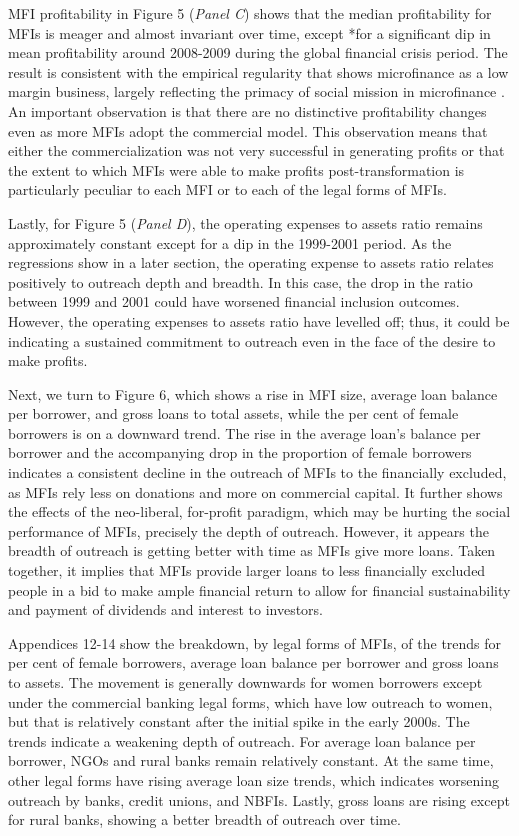 \documentclass[a4paper,nobind]{templates/ociamthesis}
\begin{document}
MFI profitability in Figure 5 (\emph{Panel C}) shows that the median profitability for MFIs is meager and almost invariant over time, except *for a significant dip in mean profitability around 2008-2009 during the global financial crisis period. The result is consistent with the empirical regularity that shows microfinance as a low margin business, largely reflecting the primacy of social mission in microfinance \autocite{hartarska2012governance}. An important observation is that there are no distinctive profitability changes even as more MFIs adopt the commercial model. This observation means that either the commercialization was not very successful in generating profits or that the extent to which MFIs were able to make profits post-transformation is particularly peculiar to each MFI or to each of the legal forms of MFIs.

Lastly, for Figure 5 (\emph{Panel D}), the operating expenses to assets ratio remains approximately constant except for a dip in the 1999-2001 period. As the regressions show in a later section, the operating expense to assets ratio relates positively to outreach depth and breadth. In this case, the drop in the ratio between 1999 and 2001 could have worsened financial inclusion outcomes. However, the operating expenses to assets ratio have levelled off; thus, it could be indicating a sustained commitment to outreach even in the face of the desire to make profits.

Next, we turn to Figure 6, which shows a rise in MFI size, average loan balance per borrower, and gross loans to total assets, while the per cent of female borrowers is on a downward trend. The rise in the average loan's balance per borrower and the accompanying drop in the proportion of female borrowers indicates a consistent decline in the outreach of MFIs to the financially excluded, as MFIs rely less on donations and more on commercial capital. It further shows the effects of the neo-liberal, for-profit paradigm, which may be hurting the social performance of MFIs, precisely the depth of outreach. However, it appears the breadth of outreach is getting better with time as MFIs give more loans. Taken together, it implies that MFIs provide larger loans to less financially excluded people in a bid to make ample financial return to allow for financial sustainability and payment of dividends and interest to investors.

Appendices 12-14 show the breakdown, by legal forms of MFIs, of the trends for per cent of female borrowers, average loan balance per borrower and gross loans to assets. The movement is generally downwards for women borrowers except under the commercial banking legal forms, which have low outreach to women, but that is relatively constant after the initial spike in the early 2000s. The trends indicate a weakening depth of outreach. For average loan balance per borrower, NGOs and rural banks remain relatively constant. At the same time, other legal forms have rising average loan size trends, which indicates worsening outreach by banks, credit unions, and NBFIs. Lastly, gross loans are rising except for rural banks, showing a better breadth of outreach over time.
\end{document}
